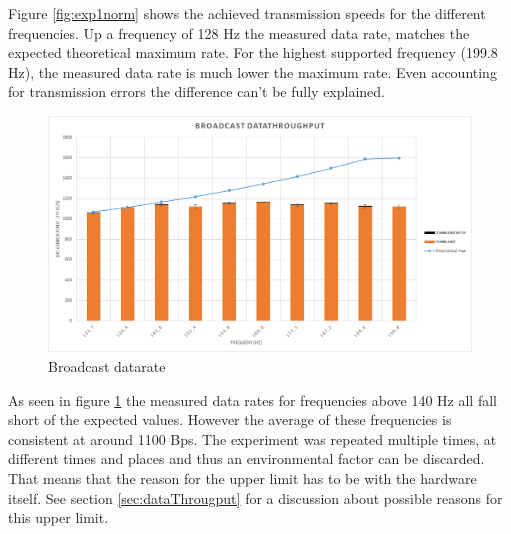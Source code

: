 \begin{description}
	Figure \ref{fig:exp1norm} shows the achieved transmission speeds for the different frequencies. Up a frequency of 128 Hz the measured data rate, matches the expected theoretical maximum rate. For the highest supported frequency (199.8 Hz), the measured data rate is much lower the maximum rate. Even accounting for transmission errors the difference can't be fully explained. 
		\begin{figure}[H]
			\centering
			\includegraphics[scale=0.5]{./pics/exp1_detail.png}
			\caption{Broadcast datarate}\label{fig:exp1between}
		\end{figure}
	\newpage
	As seen in figure \ref{fig:exp1between} the measured data rates for frequencies above 140 Hz all fall short of the expected values. However the average of these frequencies is consistent at around 1100 Bps. The experiment was repeated multiple times, at different times and places and thus an environmental factor can be discarded. That means that the reason for the upper limit has to be with the hardware itself. See section \ref{sec:dataThrougput} for a discussion about possible reasons for this upper limit.
	

\end{description}
